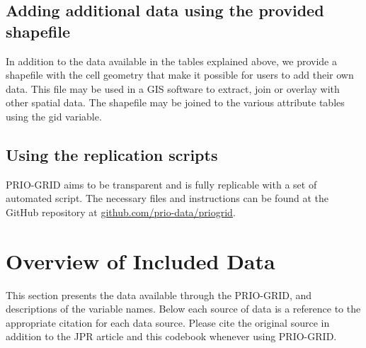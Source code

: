 \documentclass[]{book}
\begin{document}
\section{Adding additional data using the provided
shapefile}\label{adding-additional-data-using-the-provided-shapefile}

In addition to the data available in the tables explained above, we
provide a shapefile with the cell geometry that make it possible for
users to add their own data. This file may be used in a GIS software to
extract, join or overlay with other spatial data. The shapefile may be
joined to the various attribute tables using the gid variable.

\section{Using the replication
scripts}\label{using-the-replication-scripts}

PRIO-GRID aims to be transparent and is fully replicable with a set of
automated script. The necessary files and instructions can be found at
the GitHub repository at
\href{http://www.github.com/prio-data/priogrid}{github.com/prio-data/priogrid}.

\chapter{Overview of Included Data}\label{overview-of-included-data}

This section presents the data available through the PRIO-GRID, and
descriptions of the variable names. Below each source of data is a
reference to the appropriate citation for each data source. Please cite
the original source in addition to the JPR article and this codebook
whenever using PRIO-GRID.
\end{document}
